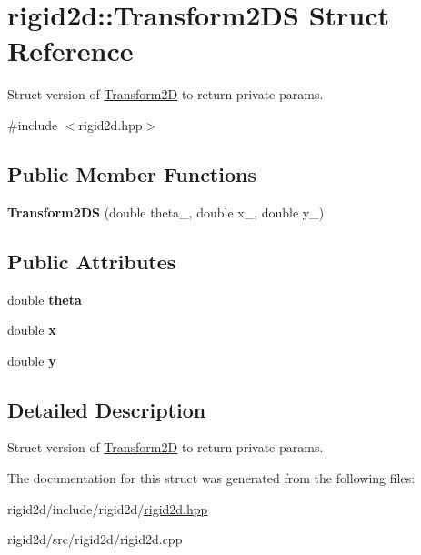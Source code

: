 \hypertarget{structrigid2d_1_1Transform2DS}{}\section{rigid2d\+:\+:Transform2\+DS Struct Reference}
\label{structrigid2d_1_1Transform2DS}


Struct version of \hyperlink{classrigid2d_1_1Transform2D}{Transform2D} to return private params.  




{\ttfamily \#include $<$rigid2d.\+hpp$>$}

\subsection*{Public Member Functions}
\begin{DoxyCompactItemize}
\item 
\mbox{\label{structrigid2d_1_1Transform2DS_ab566ee31ab671eb49db65a254c52dc7d}} 
{\bfseries Transform2\+DS} (double theta\+\_\+, double x\+\_\+, double y\+\_\+)
\end{DoxyCompactItemize}
\subsection*{Public Attributes}
\begin{DoxyCompactItemize}
\item 
\mbox{\label{structrigid2d_1_1Transform2DS_a44142569bdca7073ad89509db66e511b}} 
double {\bfseries theta}
\item 
\mbox{\label{structrigid2d_1_1Transform2DS_a9fe0aecd3f0061557ca29194495f85bf}} 
double {\bfseries x}
\item 
\mbox{\label{structrigid2d_1_1Transform2DS_a1a4d9456f6dbe8a11ef90e1f1b09be84}} 
double {\bfseries y}
\end{DoxyCompactItemize}


\subsection{Detailed Description}
Struct version of \hyperlink{classrigid2d_1_1Transform2D}{Transform2D} to return private params. 

The documentation for this struct was generated from the following files\+:\begin{DoxyCompactItemize}
\item 
rigid2d/include/rigid2d/\hyperlink{rigid2d_8hpp}{rigid2d.\+hpp}\item 
rigid2d/src/rigid2d/rigid2d.\+cpp\end{DoxyCompactItemize}
